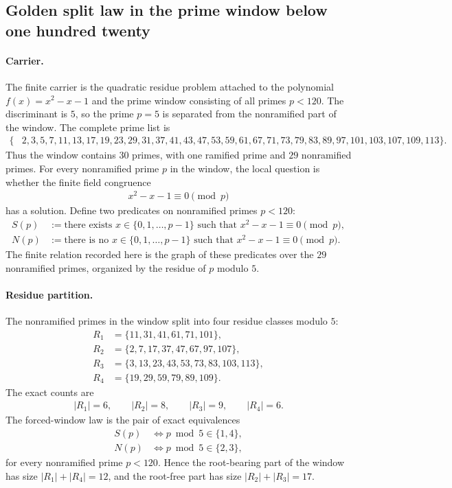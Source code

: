 
\subsection{Golden split law in the prime window below one hundred twenty}
\label{sec:window6-golden-split-modp-fibonacci-entry-point-law}

\paragraph{Carrier.}
The finite carrier is the quadratic residue problem attached to the polynomial $f(x)=x^2-x-1$ and the prime window consisting of all primes $p<120$.  The discriminant is $5$, so the prime $p=5$ is separated from the nonramified part of the window.  The complete prime list is
$$
\begin{aligned}
\{&2,3,5,7,11,13,17,19,23,29,31,37,41,43,47,53,59,61,67,71,73,79,83,89,97,101,103,107,109,113\}.
\end{aligned}
$$
Thus the window contains $30$ primes, with one ramified prime and $29$ nonramified primes.  For every nonramified prime $p$ in the window, the local question is whether the finite field congruence
$$
\begin{aligned}
x^2-x-1 \equiv 0 \pmod p
\end{aligned}
$$
has a solution.  Define two predicates on nonramified primes $p<120$:
$$
\begin{aligned}
S(p) &:= \text{there exists } x \in \{0,1,\ldots,p-1\} \text{ such that } x^2-x-1 \equiv 0 \pmod p,\\
N(p) &:= \text{there is no } x \in \{0,1,\ldots,p-1\} \text{ such that } x^2-x-1 \equiv 0 \pmod p.
\end{aligned}
$$
The finite relation recorded here is the graph of these predicates over the $29$ nonramified primes, organized by the residue of $p$ modulo $5$.

\paragraph{Residue partition.}
The nonramified primes in the window split into four residue classes modulo $5$:
$$
\begin{aligned}
R_1 &= \{11,31,41,61,71,101\},\\
R_2 &= \{2,7,17,37,47,67,97,107\},\\
R_3 &= \{3,13,23,43,53,73,83,103,113\},\\
R_4 &= \{19,29,59,79,89,109\}.
\end{aligned}
$$
The exact counts are
$$
\begin{aligned}
|R_1|=6,\qquad |R_2|=8,\qquad |R_3|=9,\qquad |R_4|=6.
\end{aligned}
$$
The forced-window law is the pair of exact equivalences
$$
\begin{aligned}
S(p) &\Longleftrightarrow p \bmod 5 \in \{1,4\},\\
N(p) &\Longleftrightarrow p \bmod 5 \in \{2,3\},
\end{aligned}
$$
for every nonramified prime $p<120$.  Hence the root-bearing part of the window has size $|R_1|+|R_4|=12$, and the root-free part has size $|R_2|+|R_3|=17$.

